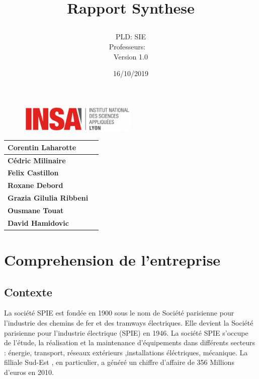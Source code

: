 \documentclass[]{scrartcl}
\title{Rapport Synthese\\
\subtitle{}
\author{PLD: SIE\\
Professeurs:\
\ \\
Version 1.0}
\date{16/10/2019}}
\begin{document}
\maketitle

\begin{figure}[h]
	\centering
  \includegraphics[width=0.5\textwidth]{img/insa-logo}
	\label{fig:logo}
\end{figure}


\begin{center}
  \begin{tabular}{ | l | r | }
    \hline
    \textbf{Corentin Laharotte}\\ \hline
    \textbf{Cédric Milinaire }\\ \hline
    \textbf{Felix Castillon}\\ \hline
    \textbf{Roxane Debord}\\ \hline
     \textbf{Grazia Gilulia Ribbeni}\\ \hline
     \textbf{Ousmane Touat} \\ \hline
     \textbf{David Hamidovic} \\ \hline


  \end{tabular}
\end{center}

\thispagestyle{empty}
\pagebreak
\vspace*{10pt}
\tableofcontents
\listoffigures
\newpage

\section{Comprehension de l'entreprise}
\subsection{Contexte}
La société SPIE est fondée en 1900 sous le nom de Société parisienne pour l'industrie des chemins de fer et des tramways électriques. Elle devient la Société parisienne pour l'industrie électrique  (SPIE) en 1946. La société SPIE s'occupe de l'étude, la réalisation et la maintenance d'équipements dans différents secteurs : énergie, transport, réseaux extérieurs ,installations éléctriques, mécanique. La filliale Sud-Est , en particulier, a généré un chiffre d'affaire de 356 Millions d'euros en 2010.
\end{document}
